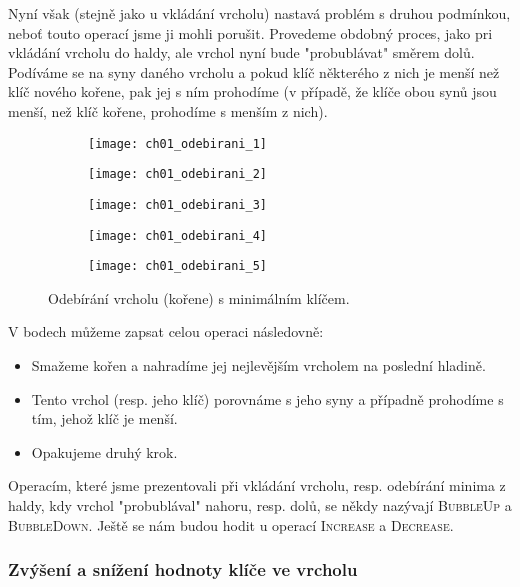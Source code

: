 Nyní však (stejně jako u vkládání vrcholu) nastavá problém s druhou podmínkou, neboť touto operací jsme ji mohli porušit. Provedeme obdobný proces, jako pri vkládání vrcholu do haldy, ale vrchol nyní bude "probublávat" směrem dolů. Podíváme se na syny daného vrcholu a pokud klíč některého z nich je menší než klíč nového kořene, pak jej s ním prohodíme (v případě, že klíče obou synů jsou menší, než klíč kořene, prohodíme s menším z nich).
\begin{figure}[h]
    \centering
    \begin{subfigure}{5cm}
        \texttt{[image: ch01\_odebirani\_1]}
    \end{subfigure}
    \begin{subfigure}{5cm}
        \texttt{[image: ch01\_odebirani\_2]}
    \end{subfigure}
    \begin{subfigure}{5cm}
        \texttt{[image: ch01\_odebirani\_3]}
    \end{subfigure}
    \begin{subfigure}{5cm}
        \texttt{[image: ch01\_odebirani\_4]}
    \end{subfigure}
    \begin{subfigure}{5cm}
        \texttt{[image: ch01\_odebirani\_5]}
    \end{subfigure}
    \caption{Odebírání vrcholu (kořene) s minimálním klíčem.}
    \label{fig:odebirani_vrcholu_halda}
\end{figure}
V bodech můžeme zapsat celou operaci následovně:
\begin{itemize}
    \item Smažeme kořen a nahradíme jej nejlevějším vrcholem na poslední hladině.
    \item Tento vrchol (resp. jeho klíč) porovnáme s jeho syny a případně prohodíme s tím, jehož klíč je menší.
    \item Opakujeme druhý krok.
\end{itemize}
Operacím, které jsme prezentovali při vkládání vrcholu, resp. odebírání minima z haldy, kdy vrchol "probublával" nahoru, resp. dolů, se někdy nazývají \textsc{BubbleUp} a \textsc{BubbleDown}. Ještě se nám budou hodit u operací \textsc{Increase} a \textsc{Decrease}.

\subsubsection{Zvýšení a snížení hodnoty klíče ve vrcholu}

